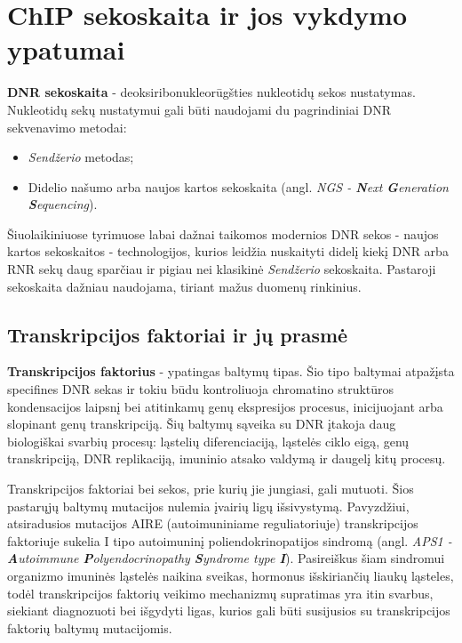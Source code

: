 \documentclass[12pt]{article}
\begin{document}
\newpage


\section{ChIP sekoskaita ir jos vykdymo ypatumai}

\textbf{DNR sekoskaita} - deoksiribonukleorūgšties nukleotidų sekos nustatymas.
Nukleotidų sekų nustatymui gali būti naudojami du pagrindiniai DNR sekvenavimo 
metodai:

\begin{itemize}
    \item \emph{Sendžerio} metodas;
    \item Didelio našumo arba naujos kartos sekoskaita
    (angl. \emph{NGS - \textbf{N}ext \textbf{G}eneration \textbf{S}equencing}).
\end{itemize}

Šiuolaikiniuose tyrimuose labai dažnai taikomos modernios DNR sekos - naujos 
kartos se\-kos\-kai\-tos - technologijos, kurios leidžia nuskaityti didelį kiekį
DNR arba RNR sekų daug sparčiau ir pigiau nei klasikinė \emph{Sendžerio} 
sekoskaita. Pastaroji sekoskaita dažniau naudojama, tiriant mažus duomenų
rinkinius.

\subsection{Transkripcijos faktoriai ir jų prasmė}

\textbf{Transkripcijos faktorius} - ypatingas baltymų tipas. Šio tipo baltymai
atpažįsta specifines DNR sekas ir tokiu būdu kontroliuoja chromatino struktūros
kondensacijos laipsnį bei atitinkamų genų ekspresijos procesus, inicijuojant
arba slopinant genų transkripciją. Šių baltymų sąveika su DNR įtakoja daug
biologiškai svarbių procesų: ląstelių diferenciaciją, ląstelės ciklo eigą, genų
transkripciją, DNR replikaciją, imuninio atsako valdymą ir daugelį kitų
procesų\cite{ARTICLE10, ARTICLE11}.

Transkripcijos faktoriai bei sekos, prie kurių jie jungiasi, gali
mutuoti. Šios pastarųjų baltymų mutacijos nulemia įvairių ligų išsivystymą.
Pavyzdžiui, atsiradusios mutacijos AIRE (autoimuniniame reguliatoriuje)
transkripcijos faktoriuje sukelia I tipo autoimuninį poliendokrinopatijos
sindromą\cite{ARTICLE9} (angl. \emph{APS1 - \textbf{A}utoimmune
\textbf{P}olyendocrinopathy \textbf{S}yndrome type \textbf{I}}). Pasireiškus
šiam sindromui organizmo imuninės ląstelės naikina sveikas, hormonus
išskiriančių liaukų ląsteles\cite{ASP1}, todėl transkripcijos faktorių veikimo
mechanizmų supratimas yra itin svarbus, siekiant diagnozuoti bei išgydyti ligas,
kurios gali būti susijusios su transkripcijos faktorių baltymų mutacijomis.
\end{document}
